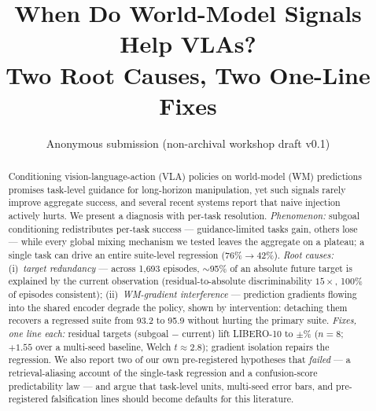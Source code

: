 \documentclass[conference]{IEEEtran}
\title{When Do World-Model Signals Help VLAs?\\
Two Root Causes, Two One-Line Fixes}
\author{Anonymous submission (non-archival workshop draft v0.1)}
\begin{document}
\maketitle

\begin{abstract}
Conditioning vision-language-action (VLA) policies on world-model (WM)
predictions promises task-level guidance for long-horizon manipulation,
yet such signals rarely improve aggregate success, and several recent
systems report that naive injection actively hurts. We present a
diagnosis with per-task resolution. \emph{Phenomenon:} subgoal
conditioning redistributes per-task success --- guidance-limited tasks
gain, others lose --- while every global mixing mechanism we tested
leaves the aggregate on a plateau; a single task can drive an entire
suite-level regression (76\%$\to$42\%). \emph{Root causes:}
(i)~\emph{target redundancy} --- across 1{,}693 episodes, $\sim$95\% of
an absolute future target is explained by the current observation
(residual-to-absolute discriminability $15\times$, 100\% of episodes
consistent); (ii)~\emph{WM-gradient interference} --- prediction
gradients flowing into the shared encoder degrade the policy, shown by
intervention: detaching them recovers a regressed suite from 93.2 to
95.9 without hurting the primary suite. \emph{Fixes, one line each:}
residual targets (subgoal $-$ current) lift LIBERO-10 to
\aggResid$\pm$\aggResidStd\% ($n{=}8$; $+1.55$ over a multi-seed
baseline, Welch $t\!\approx\!2.8$); gradient isolation repairs the
regression. We also report two of our own pre-registered hypotheses
that \emph{failed} --- a retrieval-aliasing account of the single-task
regression and a confusion-score predictability law --- and argue that
task-level units, multi-seed error bars, and pre-registered
falsification lines should become defaults for this literature.
\end{abstract}
\end{document}
